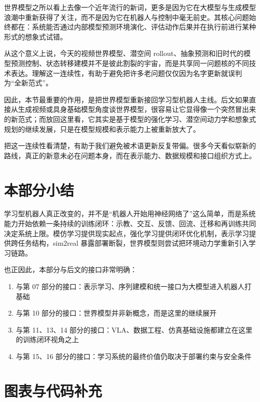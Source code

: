 世界模型之所以看上去像一个近年流行的新词，更多是因为它在大模型与生成模型浪潮中重新获得了关注，而不是因为它在机器人与控制中毫无前史。其核心问题始终都在：系统能否通过内部模型预测环境演化、评估动作后果并在执行前进行某种形式的想象式试错。

从这个意义上说，今天的视频世界模型、潜空间 rollout、抽象预测和旧时代的模型预测控制、状态转移建模并不是彼此割裂的宇宙，而是共享同一问题核的不同技术表达。理解这一连续性，有助于避免把许多老问题仅仅因为名字更新就误判为“全新范式”。

因此，本节最重要的作用，是把世界模型重新接回学习型机器人主线。后文如果直接从生成视频或具身基础模型角度谈世界模型，很容易让它显得像一个突然冒出来的新范式；而放回这里看，它其实是基于模型的强化学习、潜空间动力学和想象式规划的继续发展，只是在模型规模和表示能力上被重新放大了。

把这一连续性看清楚，有助于我们避免被术语更新反复带偏。很多今天看似崭新的路线，真正的新意未必在问题本身，而在表示能力、数据规模和接口组织方式上。

\section*{本部分小结}

学习型机器人真正改变的，并不是“机器人开始用神经网络了”这么简单，而是系统能力开始依赖一条持续的训练闭环：示教、交互、反馈、回流、迁移和再训练共同决定系统上限。模仿学习提供现实起点，强化学习提供闭环优化机制，表示学习提供跨任务结构，sim2real 暴露部署断裂，世界模型则尝试把环境动力学重新引入学习链路。

也正因此，本部分与后文的接口非常明确：

\begin{enumerate}
\item 与第 07 部分的接口：表示学习、序列建模和统一接口为大模型进入机器人打基础
\item 与第 10 部分的接口：世界模型并非新概念，而是这里的继续展开
\item 与第 11、13、14 部分的接口：VLA、数据工程、仿真基础设施都建立在这里的训练闭环视角之上
\item 与第 15、16 部分的接口：学习系统的最终价值仍取决于部署约束与安全条件
\end{enumerate}

\section*{图表与代码补充}

